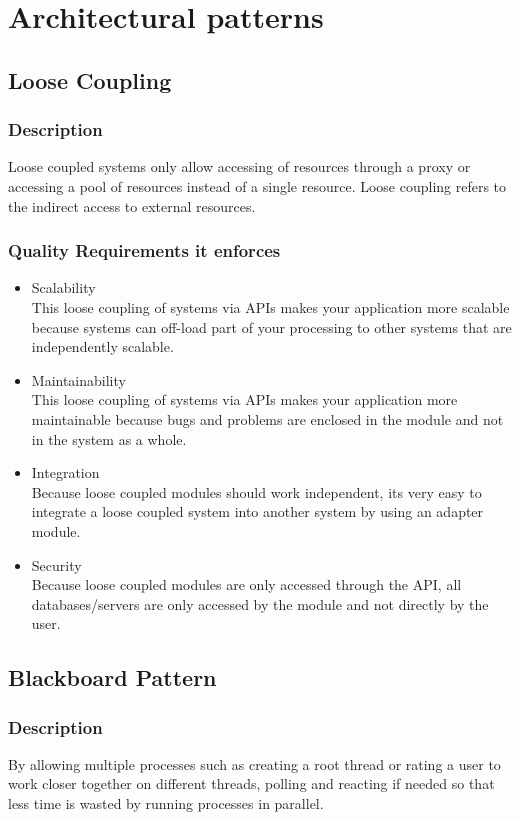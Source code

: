 
\section{Architectural patterns}
	\subsection{Loose Coupling}
		\subsubsection{Description}
		Loose coupled systems only allow accessing of resources through a proxy or accessing a pool of resources instead of a single resource. Loose coupling refers to the indirect access to external resources. 
		\subsubsection{Quality Requirements it enforces}
		\begin{itemize}
			\item Scalability \\
			This loose coupling of systems via APIs makes your application more scalable because systems can off-load part of your processing to other systems that are independently scalable. 
			\item Maintainability \\
			This loose coupling of systems via APIs makes your application more maintainable because bugs and problems are enclosed in the module and not in the system as a whole. 
			\item Integration \\
			Because loose coupled modules should work independent, its very easy to integrate a loose coupled system into another system by using an adapter module. 
			\item Security \\
			Because loose coupled modules are only accessed through the API, all databases/servers are only accessed by the module and not directly by the user.
		\end{itemize}	
			
	\subsection{Blackboard Pattern}
		\subsubsection{Description}
 By allowing multiple processes such as creating a root thread or rating a user to work closer together on different threads, polling and reacting if needed so that less time is wasted by running processes in parallel.
